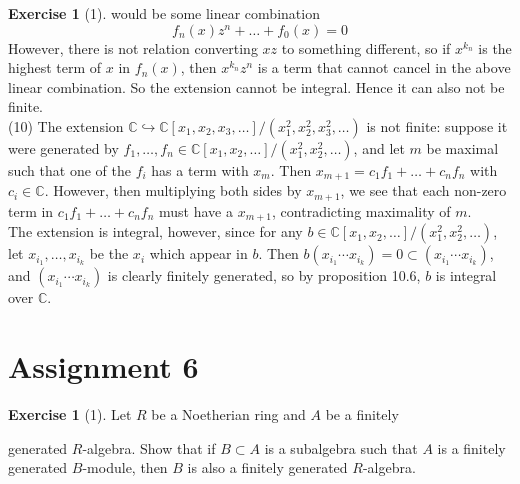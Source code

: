 \documentclass[reqno]{amsart}
\theoremstyle{definition}
\newtheorem{exercise}[theorem]{Exercise}
\theoremstyle{remark}
\begin{document}
\begin{exercise}[1]
      would be some
      linear combination
      \[
      f_n(x) z^{n} + \ldots + f_0 (x) = 0
      \]
      However, there is not relation
      converting $xz$ to something different, so if
      $x^{k_n}$ is the highest term of $x$ in
      $f_n(x)$, then
      $x^{k_n} z^{n}$ is a term that cannot
      cancel in the above linear combination.
      So the extension cannot be integral. Hence it
       can also not be finite.\\
       \linebreak
       (10) The extension
       $\mathbb{C} \hookrightarrow
       \mathbb{C}\left[ x_1, x_2, x_3, \ldots \right]
       / \left( x_1^2, x_2^2, x_3^2, \ldots \right) $
       is not finite: suppose
       it were generated by
       $f_1, \ldots, f_n \in
       \mathbb{C}\left[ x_1, x_2, \ldots \right]
       / \left( x_1^2, x_2^2, \ldots \right) $, and let
        $m$ be maximal such that
        one of the $f_i$ has a term with
        $x_m$. Then
        $x_{m+1} = c_1 f_1 + \ldots+ c_n f_n$ with
        $c_i \in \mathbb{C}$. However, then multiplying
        both sides by $x_{m+1}$, we see that
        each non-zero term in
        $c_1 f_1+ \ldots + c_n f_n$ must have a $x_{m+1}$,
        contradicting maximality of $m$.\\
        \linebreak
        The extension is integral, however, since
        for any $b \in
        \mathbb{C}\left[ x_1, x_2, \ldots \right]
        / \left( x_1^2, x_2^2, \ldots \right) $,
        let $x_{i_1}, \ldots, x_{i_k}$ be the
        $x_i$ which appear in $b$. Then
        $b \left( x_{i_1} \cdots x_{i_k} \right)
        = 0 \subset
        \left( x_{i_1} \cdots x_{i_k} \right) $, and
        $\left( x_{i_1} \cdots
        x_{i_k} \right) $ is clearly finitely generated,
        so by proposition 10.6,
        $b$ is integral over $\mathbb{C}$.




    \end{exercise}


    \section{Assignment 6}
        \begin{exercise}[1]
        Let $R$ be a Noetherian ring and $A$ be a finitely

        generated $R$-algebra. Show that if
        $B \subset A$ is a subalgebra such that $A$ is
        a finitely generated $B$-module, then
        $B$ is also a finitely generated
        $R$-algebra.
    \end{exercise}
\end{document}
